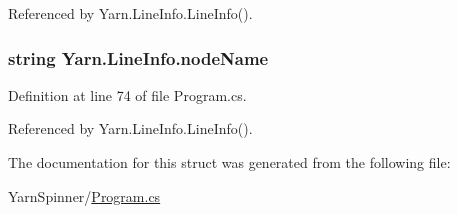 Referenced by Yarn.\-Line\-Info.\-Line\-Info().

\hypertarget{a00133_a5a91331fb123e29d71d69e096f943c2f}{
\subsubsection[{node\-Name}]{\setlength{\rightskip}{0pt plus 5cm}string Yarn.\-Line\-Info.\-node\-Name}}\label{a00133_a5a91331fb123e29d71d69e096f943c2f}


Definition at line 74 of file Program.\-cs.



Referenced by Yarn.\-Line\-Info.\-Line\-Info().



The documentation for this struct was generated from the following file\-:\begin{DoxyCompactItemize}
\item 
Yarn\-Spinner/\hyperlink{a00317}{Program.\-cs}\end{DoxyCompactItemize}
